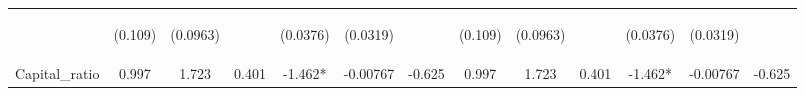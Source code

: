 \documentclass[]{article}
\begin{document}
\begin{center}
\begin{tabular}{lcccccccccccc}
\vspace{4pt} & \begin{footnotesize}(0.109)\end{footnotesize} & \begin{footnotesize}(0.0963)\end{footnotesize} & \begin{footnotesize}\end{footnotesize} & \begin{footnotesize}(0.0376)\end{footnotesize} & \begin{footnotesize}(0.0319)\end{footnotesize} & \begin{footnotesize}\end{footnotesize} & \begin{footnotesize}(0.109)\end{footnotesize} & \begin{footnotesize}(0.0963)\end{footnotesize} & \begin{footnotesize}\end{footnotesize} & \begin{footnotesize}(0.0376)\end{footnotesize} & \begin{footnotesize}(0.0319)\end{footnotesize} & \begin{footnotesize}\end{footnotesize} \\
Capital\_ratio & 0.997 & 1.723 & 0.401 & -1.462* & -0.00767 & -0.625 & 0.997 & 1.723 & 0.401 & -1.462* & -0.00767 & -0.625 \\

\end{tabular}
\end{center}
\end{document}
